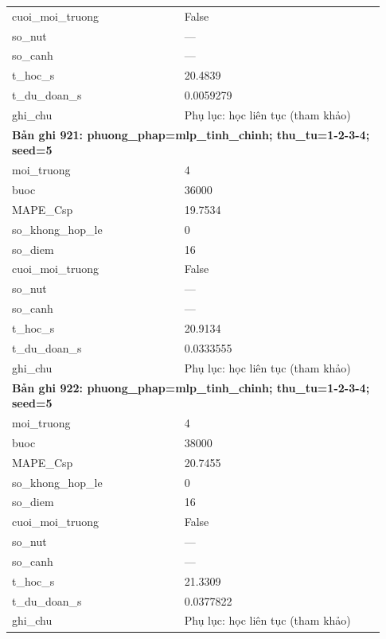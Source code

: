 \begin{longtable}{p{0.43\linewidth}p{0.50\linewidth}}
cuoi\_\allowbreak moi\_\allowbreak truong & False \\
so\_\allowbreak nut & — \\
so\_\allowbreak canh & — \\
t\_\allowbreak hoc\_\allowbreak s & 20.4839 \\
t\_\allowbreak du\_\allowbreak doan\_\allowbreak s & 0.0059279 \\
ghi\_\allowbreak chu & Phụ lục: học liên tục (tham khảo) \\
\midrule
\multicolumn{2}{p{0.95\linewidth}}{\textbf{Bản ghi 921: phuong\_phap=mlp\_tinh\_chinh; thu\_tu=1-2-3-4; seed=5}} \\
moi\_\allowbreak truong & 4 \\
buoc & 36000 \\
MAPE\_\allowbreak Csp & 19.7534 \\
so\_\allowbreak khong\_\allowbreak hop\_\allowbreak le & 0 \\
so\_\allowbreak diem & 16 \\
cuoi\_\allowbreak moi\_\allowbreak truong & False \\
so\_\allowbreak nut & — \\
so\_\allowbreak canh & — \\
t\_\allowbreak hoc\_\allowbreak s & 20.9134 \\
t\_\allowbreak du\_\allowbreak doan\_\allowbreak s & 0.0333555 \\
ghi\_\allowbreak chu & Phụ lục: học liên tục (tham khảo) \\
\midrule
\multicolumn{2}{p{0.95\linewidth}}{\textbf{Bản ghi 922: phuong\_phap=mlp\_tinh\_chinh; thu\_tu=1-2-3-4; seed=5}} \\
moi\_\allowbreak truong & 4 \\
buoc & 38000 \\
MAPE\_\allowbreak Csp & 20.7455 \\
so\_\allowbreak khong\_\allowbreak hop\_\allowbreak le & 0 \\
so\_\allowbreak diem & 16 \\
cuoi\_\allowbreak moi\_\allowbreak truong & False \\
so\_\allowbreak nut & — \\
so\_\allowbreak canh & — \\
t\_\allowbreak hoc\_\allowbreak s & 21.3309 \\
t\_\allowbreak du\_\allowbreak doan\_\allowbreak s & 0.0377822 \\
ghi\_\allowbreak chu & Phụ lục: học liên tục (tham khảo) \\

\end{longtable}
